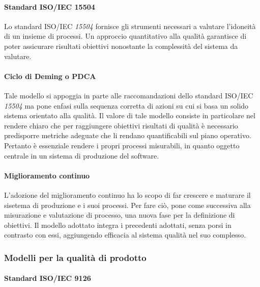 \documentclass[12pt,a4paper]{article}
\begin{document}
\paragraph{Standard ISO/IEC 15504}
Lo standard ISO/IEC \textit{15504} fornisce gli strumenti necessari a valutare l'idoneità di un insieme di processi. Un approccio quantitativo alla qualità garantisce di poter assicurare risultati obiettivi nonostante la complessità del sistema da valutare.

\paragraph{Ciclo di Deming o PDCA}
Tale modello si appoggia in parte alle raccomandazioni dello standard ISO/IEC \textit{15504} ma pone enfasi sulla sequenza corretta di azioni su cui si basa un solido sistema orientato alla qualità. 
Il valore di tale modello consiste in particolare nel rendere chiaro che per raggiungere obiettivi risultati di qualità è necessario predisporre metriche adeguate che li rendano quantificabili sul piano operativo. Pertanto è essenziale rendere i propri processi misurabili, in quanto oggetto centrale in un sistema di produzione del software.
\paragraph{Miglioramento continuo}
L'adozione del miglioramento continuo ha lo scopo di far crescere e maturare il sisetema di produzione e i suoi processi. Per fare ciò, pone come successiva alla misurazione e valutazione di processo, una nuova fase per la definizione di obiettivi. 
Il modello adottato integra i precedenti adottati, senza porsi in contrasto con essi, aggiungendo efficacia al sistema qualità nel suo complesso.
\subsubsection{Modelli per la qualità di prodotto}
\paragraph{Standard ISO/IEC 9126}
\end{document}
